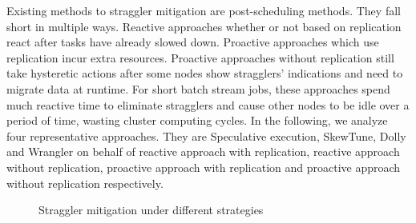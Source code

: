 \documentclass[10pt,conference,compsocconf,letterpaper]{IEEEtran}
\begin{document}
  Existing methods to straggler mitigation are post-scheduling methods. They fall short in multiple ways. Reactive approaches whether or not based on replication react after tasks have already slowed down. Proactive approaches which use replication incur extra resources. Proactive approaches without replication still take hysteretic actions after some nodes show stragglers' indications and need to migrate data at runtime. For short batch stream jobs, these approaches spend much reactive time to eliminate stragglers and cause other nodes to be idle over a period of time, wasting cluster computing cycles. In the following, we analyze four representative approaches. They are Speculative execution, SkewTune, Dolly and Wrangler on behalf of reactive approach with replication, reactive approach without replication, proactive approach with replication and proactive approach without replication respectively.
  \begin{figure}[htbp]
    \centering
    \hfill
    \hfill
    \caption{Straggler mitigation under different strategies}
    \label{Fig. 2:}
  \end{figure}
\end{document}

